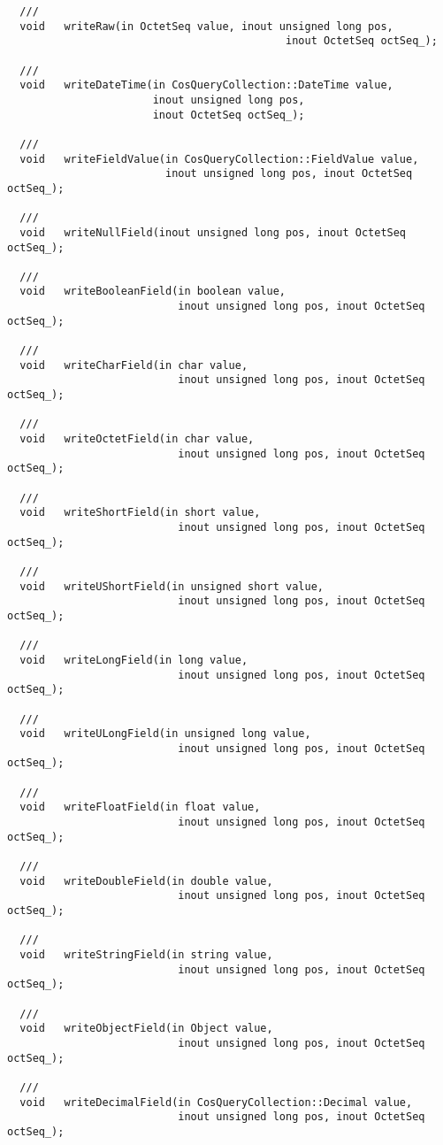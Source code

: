 \documentclass[10pt]{article}
\begin{document}
\begin{verbatim}
  ///
  void   writeRaw(in OctetSeq value, inout unsigned long pos,
                                            inout OctetSeq octSeq_);

  ///
  void   writeDateTime(in CosQueryCollection::DateTime value, 
                       inout unsigned long pos,
                       inout OctetSeq octSeq_);

  ///
  void   writeFieldValue(in CosQueryCollection::FieldValue value,
                         inout unsigned long pos, inout OctetSeq octSeq_); 

  ///
  void   writeNullField(inout unsigned long pos, inout OctetSeq octSeq_);

  ///
  void   writeBooleanField(in boolean value,
                           inout unsigned long pos, inout OctetSeq octSeq_);

  ///
  void   writeCharField(in char value,
                           inout unsigned long pos, inout OctetSeq octSeq_);

  ///
  void   writeOctetField(in char value,
                           inout unsigned long pos, inout OctetSeq octSeq_);

  ///
  void   writeShortField(in short value,
                           inout unsigned long pos, inout OctetSeq octSeq_);

  ///
  void   writeUShortField(in unsigned short value,
                           inout unsigned long pos, inout OctetSeq octSeq_);

  ///
  void   writeLongField(in long value,
                           inout unsigned long pos, inout OctetSeq octSeq_);

  ///
  void   writeULongField(in unsigned long value,
                           inout unsigned long pos, inout OctetSeq octSeq_);

  ///
  void   writeFloatField(in float value,
                           inout unsigned long pos, inout OctetSeq octSeq_);

  ///
  void   writeDoubleField(in double value,
                           inout unsigned long pos, inout OctetSeq octSeq_);

  ///
  void   writeStringField(in string value,
                           inout unsigned long pos, inout OctetSeq octSeq_);

  ///
  void   writeObjectField(in Object value,
                           inout unsigned long pos, inout OctetSeq octSeq_);

  ///
  void   writeDecimalField(in CosQueryCollection::Decimal value,
                           inout unsigned long pos, inout OctetSeq octSeq_);


\end{verbatim}
\end{document}
